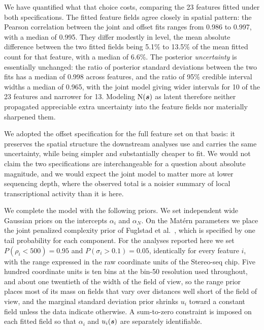 \documentclass[10pt,letterpaper]{article}
\begin{document}
We have quantified what that choice costs, comparing the 23 features fitted under both specifications. The fitted feature fields agree closely in spatial pattern: the Pearson correlation between the joint and offset fits ranges from 0.986 to 0.997, with a median of 0.995. They differ modestly in level, the mean absolute difference between the two fitted fields being 5.1\% to 13.5\% of the mean fitted count for that feature, with a median of 6.6\%. The posterior \textit{uncertainty} is essentially unchanged: the ratio of posterior standard deviations between the two fits has a median of 0.998 across features, and the ratio of 95\% credible interval widths a median of 0.965, with the joint model giving wider intervals for 10 of the 23 features and narrower for 13. Modeling $\mbox{N}(\mbox{\boldmath $s$})$ as latent therefore neither propagated appreciable extra uncertainty into the feature fields nor materially sharpened them.

We adopted the offset specification for the full feature set on that basis: it preserves the spatial structure the downstream analyses use and carries the same uncertainty, while being simpler and substantially cheaper to fit. We would not claim the two specifications are interchangeable for a question about absolute magnitude, and we would expect the joint model to matter more at lower sequencing depth, where the observed total is a noisier summary of local transcriptional activity than it is here.

We complete the model with the following priors. We set independent wide Gaussian priors on the intercepts $\alpha_i$ and $\alpha_N$. On the Mat\'ern parameters we place the joint penalized complexity prior of Fuglstad et al.\ \cite{fuglstad2019}, which is specified by one tail probability for each component. For the analyses reported here we set $P(\rho_i < 500) = 0.95$ and $P(\sigma_i > 0.1) = 0.05$, identically for every feature $i$, with the range expressed in the raw coordinate units of the Stereo-seq chip. Five hundred coordinate units is ten bins at the bin-50 resolution used throughout, and about one twentieth of the width of the field of view, so the range prior places most of its mass on fields that vary over distances well short of the field of view, and the marginal standard deviation prior shrinks $u_i$ toward a constant field unless the data indicate otherwise. A sum-to-zero constraint is imposed on each fitted field so that $\alpha_i$ and $u_i(\mbox{\boldmath $s$})$ are separately identifiable.
\end{document}
